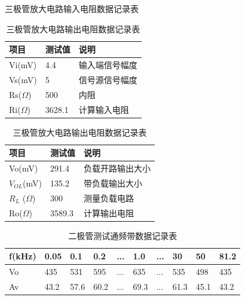 \documentclass[]{article}
\begin{document}
\begin{table}

	\centering
		
	\begin{minipage}{0.9\linewidth}
		\centering
		\caption{三极管放大电路输入电阻数据记录表}
		
		\begin{tabular}{lll}
			\hline
			项目  & 测试值    & 说明  \\
			\hline
			Vi(mV) & 4.4 & 输入端信号幅度 \\
			\hline
			Vs(mV) & 5 & 信号源信号幅度 \\
			\hline
			Rs($ \Omega $) & 500 & 内阻 \\
			\hline
			Ri($ \Omega $) & 3628.1 & 计算输入电阻 \\
			\hline
		\end{tabular}
	\end{minipage}
	
	\begin{minipage}{0.9\linewidth}
		\centering
		\caption{三极管放大电路输出电阻数据记录表}
		
		\begin{tabular}{lll}
			\hline
			项目  & 测试值    & 说明  \\
			\hline
			Vo(mV) & 291.4 & 负载开路输出大小 \\
			\hline
			$ V_{OL} $(mV) & 135.2 & 带负载输出大小 \\
			\hline
			$ R_L $ ($ \Omega $) & 300 & 测量负载电路 \\
			\hline
			Ro($ \Omega $) & 3589.3 & 计算输出电阻 \\
			\hline
		\end{tabular}

	\end{minipage}

\end{table}




\begin{table}[h]
	\centering
	\caption{二极管测试通频带数据记录表}
	
	\begin{tabular}{llllllllll}
		\hline
		f(kHz) & 0.05     & 0.1    & 0.2 & ... & 1.0 & ... & 30 & 50 & 81.2 \\
		\hline
		Vo  & 435 & 531 & 595 & ... & 635 & ... & 535 & 498 & 435 \\
		\hline
		Av  & 43.2 & 57.6 & 60.2 & ... & 69.3 & ... & 61.3 & 45.1 & 43.2 \\
		\hline
	\end{tabular}
	
\end{table}
\end{document}
